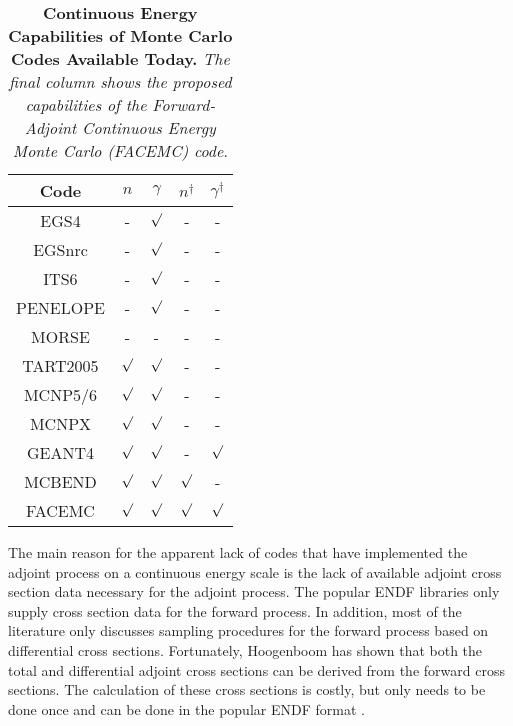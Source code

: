 \begin{table}[ht]
\label{table:monte_carlo_codes_today}
  \caption{\textbf{Continuous Energy Capabilities of Monte Carlo Codes Available
      Today.}
    \textit{The final column shows the proposed capabilities of the 
      Forward-Adjoint Continuous Energy Monte Carlo (FACEMC) code}.}
  \centering
  \begin{tabular}{c c c c c }
    \hline\hline
    Code & $n$ & $\gamma$ &  $n^{\dagger}$ & $\gamma^{\dagger}$ \\ [0.5ex]
    \hline
    EGS4 & - & $\surd$ & - & - \\
    EGSnrc & - & $\surd$ & - & - \\
    ITS6 & - & $\surd$ & - & - \\
    PENELOPE & - & $\surd$ & - & - \\
    MORSE & - & - & - & - \\
    TART2005 & $\surd$ & $\surd$ & - & - \\
    MCNP5/6 & $\surd$ & $\surd$ & - & - \\
    MCNPX & $\surd$ & $\surd$ & - & - \\
    GEANT4 & $\surd$ & $\surd$ & - & $\surd$ \\
    MCBEND & $\surd$ & $\surd$ & $\surd$ & - \\ [1ex]
    \hline
    FACEMC & $\surd$ & $\surd$ & $\surd$ & $\surd$ \\ [1ex]
    \hline
  \end{tabular}
  \label{table:mccodes}
\end{table}

The main reason for the apparent lack of codes that have implemented the 
adjoint process on a continuous energy scale is the lack of available adjoint 
cross section data necessary for the adjoint process. The popular ENDF 
libraries only supply cross section data for the forward process. In addition, 
most of the literature only discusses sampling procedures for the forward 
process based on differential cross sections. Fortunately, Hoogenboom has shown 
that both the total and differential adjoint cross sections can be derived from 
the forward cross sections. The calculation of these cross sections is costly, 
but only needs to be done once and can be done in the popular ENDF format
\citep{hoogenboom_adjoint_1977}. 

